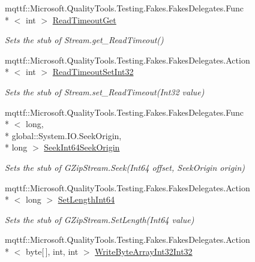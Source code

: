 \begin{DoxyCompactItemize}
mqttf\-::\-Microsoft.\-Quality\-Tools.\-Testing.\-Fakes.\-Fakes\-Delegates.\-Func\\*
$<$ int $>$ \hyperlink{class_system_1_1_i_o_1_1_compression_1_1_fakes_1_1_stub_g_zip_stream_a7e2c731fc2fbb1b9f0ab8d53e19c6b5e}{Read\-Timeout\-Get}
\begin{DoxyCompactList}\small\item\em Sets the stub of Stream.\-get\-\_\-\-Read\-Timeout()\end{DoxyCompactList}\item 
mqttf\-::\-Microsoft.\-Quality\-Tools.\-Testing.\-Fakes.\-Fakes\-Delegates.\-Action\\*
$<$ int $>$ \hyperlink{class_system_1_1_i_o_1_1_compression_1_1_fakes_1_1_stub_g_zip_stream_ae8089da09446167858d55c5f25d6d998}{Read\-Timeout\-Set\-Int32}
\begin{DoxyCompactList}\small\item\em Sets the stub of Stream.\-set\-\_\-\-Read\-Timeout(\-Int32 value)\end{DoxyCompactList}\item 
mqttf\-::\-Microsoft.\-Quality\-Tools.\-Testing.\-Fakes.\-Fakes\-Delegates.\-Func\\*
$<$ long, \\*
global\-::\-System.\-I\-O.\-Seek\-Origin, \\*
long $>$ \hyperlink{class_system_1_1_i_o_1_1_compression_1_1_fakes_1_1_stub_g_zip_stream_a648da6739fd293c10e50ec9201888c67}{Seek\-Int64\-Seek\-Origin}
\begin{DoxyCompactList}\small\item\em Sets the stub of G\-Zip\-Stream.\-Seek(\-Int64 offset, Seek\-Origin origin)\end{DoxyCompactList}\item 
mqttf\-::\-Microsoft.\-Quality\-Tools.\-Testing.\-Fakes.\-Fakes\-Delegates.\-Action\\*
$<$ long $>$ \hyperlink{class_system_1_1_i_o_1_1_compression_1_1_fakes_1_1_stub_g_zip_stream_ae689969ec735469f1c260b4c961ec21d}{Set\-Length\-Int64}
\begin{DoxyCompactList}\small\item\em Sets the stub of G\-Zip\-Stream.\-Set\-Length(\-Int64 value)\end{DoxyCompactList}\item 
mqttf\-::\-Microsoft.\-Quality\-Tools.\-Testing.\-Fakes.\-Fakes\-Delegates.\-Action\\*
$<$ byte\mbox{[}$\,$\mbox{]}, int, int $>$ \hyperlink{class_system_1_1_i_o_1_1_compression_1_1_fakes_1_1_stub_g_zip_stream_a3dfcc317aec5640f8de5290f27b8678a}{Write\-Byte\-Array\-Int32\-Int32}

\end{DoxyCompactItemize}
